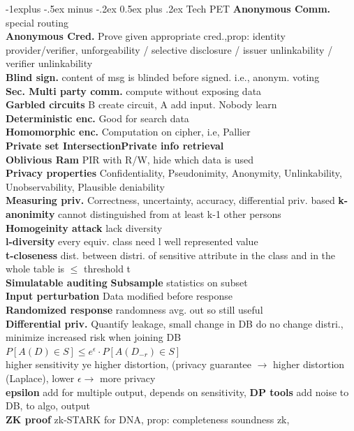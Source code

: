 \documentclass[10pt,landscape]{article}
\makeatletter
\renewcommand{\subsection}{\@startsection{subsection}{2}{0mm}%
                                {-1explus -.5ex minus -.2ex}%
                                {0.5ex plus .2ex}%
                                {\normalfont\normalsize\bfseries}}
\makeatother
\begin{document}
\begin{multicols*}{4}
\subsection{Tech PET}
\textbf{Anonymous Comm.} special routing\\
\textbf{Anonymous Cred.} Prove given appropriate cred.,prop: identity provider/verifier, unforgeability / selective disclosure / issuer unlinkability / verifier unlinkability\\
\textbf{Blind sign.} content of msg is blinded before signed. i.e., anonym. voting\\
\textbf{Sec. Multi party comm.} compute without exposing data\\
\textbf{Garbled circuits} B create circuit, A add input. Nobody learn\\
\textbf{Deterministic enc.} Good for search data\\
\textbf{Homomorphic enc.} Computation on cipher, i.e, Pallier\\
\textbf{Private set Intersection}\textbf{Private info retrieval}\\
\textbf{Oblivious Ram} PIR with R/W, hide which data is used\\
\textbf{Privacy properties} Confidentiality, Pseudonimity, Anonymity, Unlinkability, Unobservability, Plausible deniability\\
\textbf{Measuring priv.} Correctness, uncertainty, accuracy, differential priv. based
\textbf{k-anonimity} cannot distinguished from at least k-1 other persons\\
\textbf{Homogeinity attack} lack diversity\\
\textbf{l-diversity} every equiv. class need l well represented value\\
\textbf{t-closeness} dist. between distri. of sensitive attribute in the class and in the whole table is $\leq$ threshold t\\
\textbf{Simulatable auditing}
\textbf{Subsample} statistics on subset\\
\textbf{Input perturbation} Data modified before response\\
\textbf{Randomized response} randomness avg. out so still useful\\
\textbf{Differential priv.} Quantify leakage, small change in DB do no change distri., minimize increased risk when joining DB\\
$P[A(D)\in S] \leq e^\epsilon \cdot P[A(D_{-r})\in S]$\\
higher sensitivity ye higher distortion, (privacy guarantee $\rightarrow$ higher distortion (Laplace),
lower $\epsilon\rightarrow$ more privacy\\
\textbf{epsilon} add for multiple output, depends on sensitivity, 
\textbf{DP tools} add noise to DB, to algo, output\\
\textbf{ZK proof} zk-STARK for DNA, prop: completeness soundness zk,


\end{multicols*}
\end{document}
